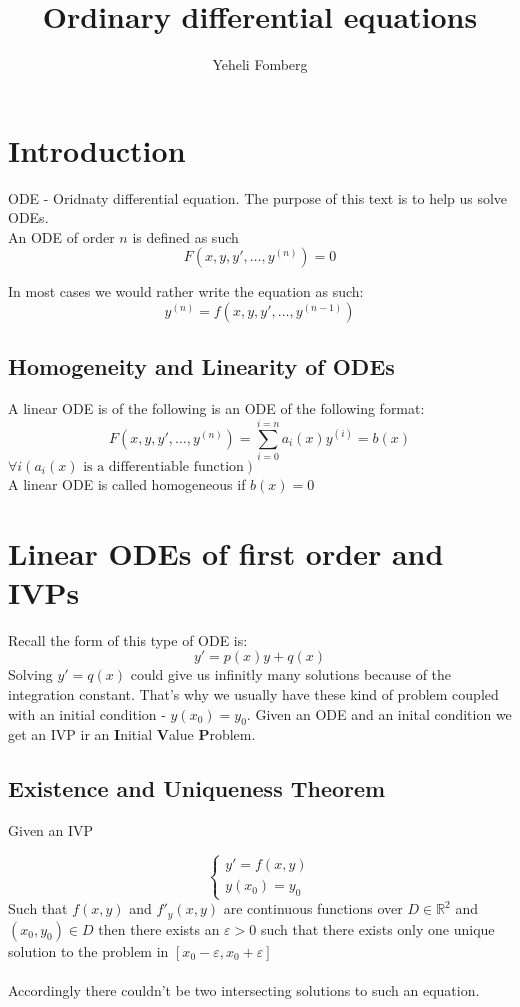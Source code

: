 \documentclass{article}
\title{\textbf{Ordinary differential equations}}
\author{Yeheli Fomberg}
\date{}
\newcommand{\R}{\mathbb{R}}
\begin{document}
	\maketitle
	\newpage
	\tableofcontents
	\newpage
	\section{Introduction}
	
	ODE - Oridnaty differential equation. The purpose of this text is to help us solve ODEs. \\
	
	An ODE of order $n$ is defined as such
	$$F(x,y,y',\ldots,y^{(n)})=0$$
	
	In most cases we would rather write the equation as such:
	$$y^{(n)}=f(x,y,y',\ldots,y^{(n-1)})$$
	\subsection{Homogeneity and Linearity of ODEs}
	A linear ODE is of the following is an ODE of the following format:
	$$F(x,y,y',\ldots,y^{(n)})=\sum_{i=0}^{i=n}{a_i(x)y^{(i)}}=b(x)$$
	$\forall i(a_i(x)\text{ is a differentiable function})$
	\\ A linear ODE is called homogeneous if $b(x)=0$	
	
	\newpage
	\section{Linear ODEs of first order and IVPs}
	Recall the form of this type of ODE is:
	$$y'=p(x)y+q(x)$$
	Solving $y'=q(x)$ could give us infinitly many solutions because of the integration constant. That's why we usually have these kind of problem coupled with an initial condition - $y(x_0)=y_0$. Given an ODE and an inital condition we get an IVP ir an \textbf{I}nitial \textbf{V}alue \textbf{P}roblem.
	\subsection{Existence and Uniqueness Theorem}
	Given an IVP
	
	\begin{equation}
    \begin{cases}
    y'=f(x,y) \\
    y(x_0)=y_0
    \end{cases}
	\end{equation}
	Such that $f(x,y)$ and $f'_y(x,y)$ are continuous functions over $D\in\R^2$ and $(x_0,y_0)\in D$ then there exists an $\varepsilon>0$ such that there exists only one unique solution to the problem in $[x_0-\varepsilon,x_0+\varepsilon]$ \\
	\\
	Accordingly there couldn't be two intersecting solutions to such an equation.
\end{document}

